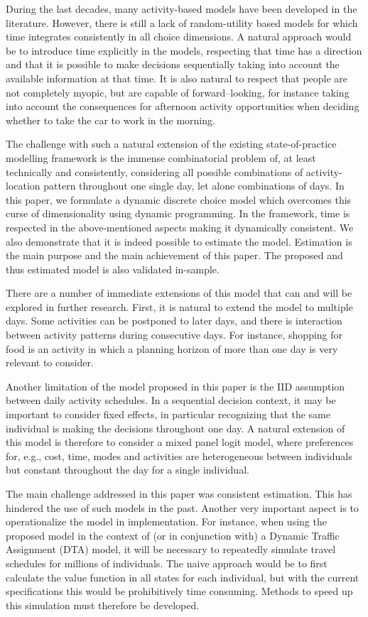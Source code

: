 During the last decades, many activity-based models have been developed in the literature. However, there is still a lack of random-utility based models for which time integrates consistently in all choice dimensions. A natural approach would be to introduce time explicitly in the models, respecting that time has a direction and that it is possible to make decisions sequentially taking into account the available information at that time. It is also natural to respect that people are not completely myopic, but are capable of forward--looking, for instance taking into account the consequences for afternoon activity opportunities when deciding whether to take the car to work in the morning. 

The challenge with such a natural extension of the existing state-of-practice modelling framework is the immense combinatorial problem of, at least technically and consistently, considering all possible combinations of activity-location pattern throughout one single day, let alone combinations of days. In this paper, we formulate a dynamic discrete choice model which overcomes this curse of dimensionality using dynamic programming. In the framework, time is respected in the above-mentioned aspects making it dynamically consistent. 
We also demonstrate that it is indeed possible to estimate the model. Estimation is the main purpose and the main achievement of this paper. The proposed and thus estimated model is also validated in-sample. 

There are a number of immediate extensions of this model that can and will be explored in further research. First, it is natural to extend the model to multiple days. Some activities can be postponed to later days, and there is interaction between activity patterns during consecutive days. For instance, shopping for food is an activity in which a planning horizon of more than one day is very relevant to consider. 

Another limitation of the model proposed in this paper is the IID assumption between daily activity schedules. In a sequential decision context, it may be important to consider fixed effects, in particular recognizing that the same individual is making the decisions throughout one day. A natural extension of this model is therefore to consider a mixed panel logit model, where preferences for, e.g., cost, time, modes and activities are heterogeneous between individuals but constant throughout the day for a single individual.

The main challenge addressed in this paper was consistent estimation. This has hindered the use of such models in the past. Another very important aspect is to operationalize the model in implementation. For instance, when using the proposed model in the context of (or in conjunction with) a Dynamic Traffic Assignment (DTA) model, it will be necessary to repeatedly simulate travel schedules for millions of individuals. The naive approach would be to first calculate the value function in all states for each individual, but with the current specifications this would be prohibitively time consuming. Methods to speed up this simulation must therefore be developed.